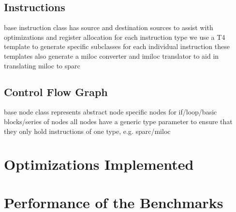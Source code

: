 \documentclass[12pt]{article}
\begin{document}
\subsection{Instructions}
base instruction class has source and destination sources to assist with optimizations and register allocation
for each instruction type we use a T4 template to generate specific subclasses for each individual instruction
these templates also generate a miloc converter and imiloc translator to aid in translating miloc to sparc

\subsection{Control Flow Graph}
base node class represents abstract node
specific nodes for if/loop/basic blocks/series of nodes
all nodes have a generic type parameter to ensure that they only hold instructions of one type, e.g. sparc/miloc

\section{Optimizations Implemented}
\section{Performance of the Benchmarks}
  
\end{document}
